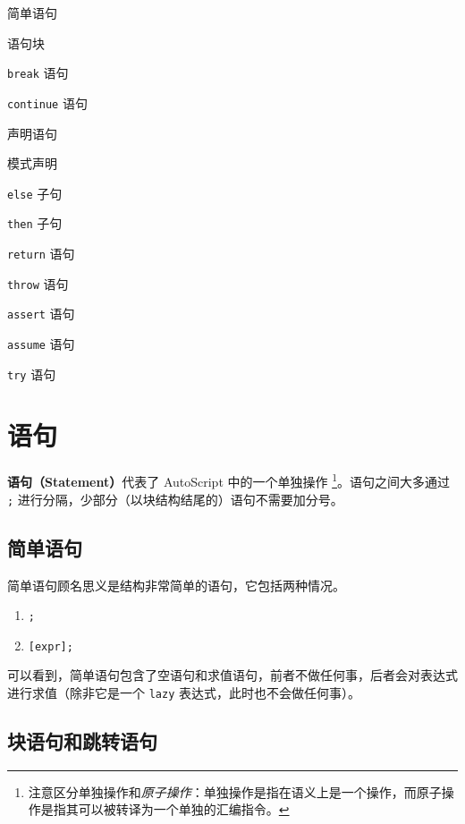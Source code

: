 \begin{introduction}
    \item 简单语句
    \item 语句块
    \item \lstinline!break! 语句
    \item \lstinline!continue! 语句
    \item 声明语句
    \item 模式声明
    \item \lstinline!else! 子句
    \item \lstinline!then! 子句
    \item \lstinline!return! 语句
    \item \lstinline!throw! 语句
    \item \lstinline!assert! 语句
    \item \lstinline!assume! 语句
    \item \lstinline!try! 语句
\end{introduction}

\section{语句}

\textbf{语句（Statement）}代表了 AutoScript 中的一个单独操作 \footnote{注意区分单独操作和\emph{原子操作}：单独操作是指在语义上是一个操作，而原子操作是指其可以被转译为一个单独的汇编指令。}。语句之间大多通过 \lstinline!;! 进行分隔，少部分（以块结构结尾的）语句不需要加分号。

\subsection{简单语句}

简单语句顾名思义是结构非常简单的语句，它包括两种情况。

\begin{grammar}[简单语句] \label{grm:simple-statement}
\begin{enumerate}
	\item \lstinline!;!
	\item \lstinline![expr];!
\end{enumerate}
\end{grammar}

可以看到，简单语句包含了空语句和求值语句，前者不做任何事，后者会对表达式进行求值（除非它是一个 \lstinline!lazy! 表达式，此时也不会做任何事）。

\subsection{块语句和跳转语句}

